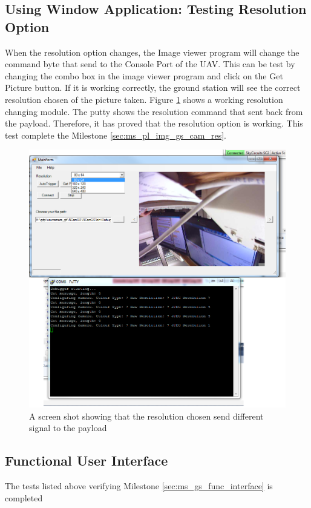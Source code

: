 \subsection{Using Window Application: Testing Resolution Option}
When the resolution option changes, the Image viewer program will change the command byte that send to the Console Port of the UAV. 
This can be test by changing the combo box in the image viewer program and click on the Get Picture button.
If it is working correctly, the ground station will see the correct resolution chosen of the picture taken.
Figure \ref{resolution testing} shows a working resolution changing module. 
The putty shows the resolution command that sent back from the payload.
Therefore, it has proved that the resolution option is working.
This test complete the Milestone \ref{sec:ms_pl_img_gs_cam_res}.
\begin{figure}[H]
\begin{center}
\includegraphics[width=1.00\textwidth]{testing_screenshots/change_res_ncam_1.png} 
\end{center}
\caption{A screen shot showing that the resolution chosen send different signal to the payload\label{resolution testing}}
\end{figure}
\subsection{Functional User Interface}
The tests listed above verifying Milestone \ref{sec:ms_gs_func_interface} is completed

